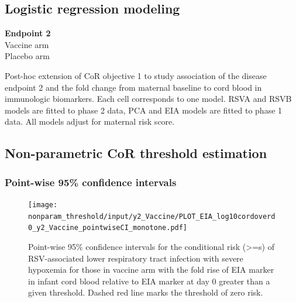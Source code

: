 \documentclass[11pt]{article}
\begin{document}
\hypertarget{logistic-regression-modeling}{%
\subsection{Logistic regression modeling}\label{logistic-regression-modeling}}

\begin{table}[H]
\tiny{
    \textbf{Endpoint 2}\\
    Vaccine arm\\
    
    
    \vspace{5pt}
    Placebo arm\\
    
}
    \caption{Post-hoc extension of CoR objective 1 to study association of the disease endpoint 2 and the fold change from maternal baseline to cord blood in immunologic biomarkers. Each cell corresponds to one model. RSVA and RSVB models are fitted to phase 2 data, PCA and EIA models are fitted to phase 1 data. All models adjust for maternal risk score. }
    \label{tab:CoR_obj1a_cordoverd0}
\end{table}

\clearpage

\hypertarget{non-parametric-cor-threshold-estimation}{%
\subsection{Non-parametric CoR threshold estimation}\label{non-parametric-cor-threshold-estimation}}

\hypertarget{point-wise-95-confidence-intervals}{%
\subsubsection{Point-wise 95\% confidence intervals}\label{point-wise-95-confidence-intervals}}

\begin{figure}[H]
    \centering
    \texttt{[image: nonparam\_threshold/input/y2\_Vaccine/PLOT\_EIA\_log10cordoverd0\_y2\_Vaccine\_pointwiseCI\_monotone.pdf]}
   \caption{Point-wise 95\% confidence intervals for the conditional risk (>=s) of RSV-associated lower respiratory tract infection with severe hypoxemia for those in vaccine arm with the fold rise of EIA marker in infant cord blood relative to EIA marker at day 0 greater than a given threshold. Dashed red line marks the threshold of zero risk.}
   \label{tab:PLOT_EIA_log10cordoverd0_y2_Vaccine_pointwise_monotone}
\end{figure}
\end{document}
